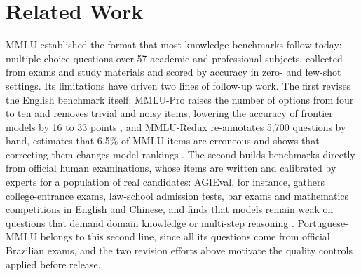 %

\section{Related Work}
\label{sec:related}

MMLU \citep{hendrycks2021mmlu} established the format that most knowledge
benchmarks follow today: multiple-choice questions over 57 academic and
professional subjects, collected from exams and study materials and scored by
accuracy in zero- and few-shot settings. Its limitations have driven two lines
of follow-up work. The first revises the English benchmark itself: MMLU-Pro
raises the number of options from four to ten and removes trivial and noisy
items, lowering the accuracy of frontier models by 16 to 33 points
\citep{wang2024mmlupro}, and MMLU-Redux re-annotates 5,700 questions by hand,
estimates that 6.5\% of MMLU items are erroneous and shows that correcting
them changes model rankings \citep{gema2025mmluredux}. The second builds
benchmarks directly from official human examinations, whose items are written
and calibrated by experts for a population of real candidates: AGIEval, for
instance, gathers college-entrance exams, law-school admission tests, bar
exams and mathematics competitions in English and Chinese, and finds that
models remain weak on questions that demand domain knowledge or multi-step
reasoning \citep{zhong2024agieval}. Portuguese-MMLU belongs to this second
line, since all its questions come from official Brazilian exams, and the two
revision efforts above motivate the quality controls applied before release.


